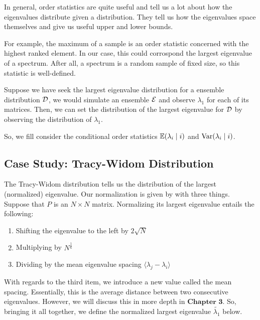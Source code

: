 In general, order statistics are quite useful and tell us a lot about how the eigenvalues distribute given a distribution. They tell us how the eigenvalues space themselves and give us useful upper and lower bounds. 

For example, the maximum of a sample is an order statistic concerned with the highest ranked element. In our case, this could corrospond the largest eigenvalue of a spectrum. After all, a spectrum is a random sample of fixed size, so this statistic is well-defined. 

\begin{example}
Suppose we have seek the largest eigenvalue distribution for a ensemble distribution $\mathcal{D}$, we would simulate an ensemble $\mathcal{E}$ and observe $\lambda_1$ for each of its matrices. Then, we can set the distribution of the largest eigenvalue for $\mathcal{D}$ by observing the distribution of $\lambda_1$. 
\end{example}

So, we fill consider the conditional order statistics $\mathbb{E}(\lambda_{i} \mid i)$ and $\text{Var}(\lambda_{i} \mid i)$.


\subsection{Case Study: Tracy-Widom Distribution}

The Tracy-Widom distribution tells us the distribution of the largest (normalized) eigenvalue. Our normalization is given by with three things. Suppose that $P$ is an $N \times N$ matrix. Normalizing its largest eigenvalue entails the following:
\begin{enumerate}
  \item Shifting the eigenvalue to the left by $2\sqrt{N}$
  \item Multiplying by $N^{\frac{1}{6}}$
  \item Dividing by the mean eigenvalue spacing $\langle \lambda_j - \lambda_i \rangle$
\end{enumerate}
\hfill

With regards to the third item, we introduce a new value called the mean spacing. Essentially, this is the average distance between two consecutive eigenvalues. However, we will discuss this in more depth in $\textbf{Chapter 3}$. So, bringing it all together, we define the normalized largest eigenvalue $\widetilde{\lambda_1}$ below.

